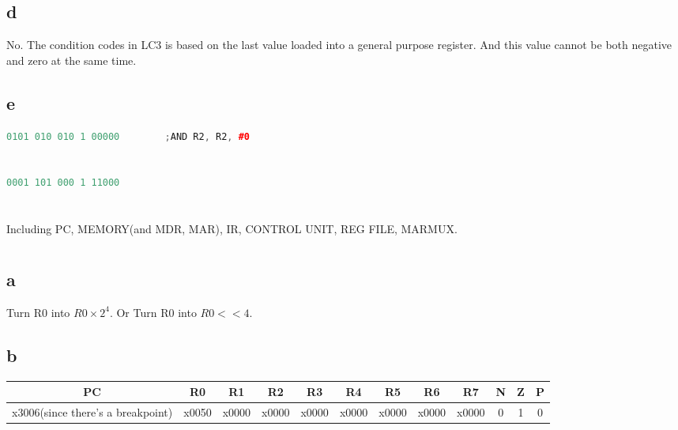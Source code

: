 \documentclass[11pt,a4paper]{article}
\begin{document}
	\subsection*{d}
	No. The condition codes in LC3 is based on the last value loaded into a general purpose register. And this value cannot be both negative and zero at the same time.\par
	\subsection*{e}
	\begin{lstlisting}[language=C++]
	0101 010 010 1 00000		;AND R2, R2, #0
	\end{lstlisting}
	
	\section{}
	\begin{lstlisting}[language=C++]
	0001 101 000 1 11000
	\end{lstlisting}
	
	\section{}
	Including PC, MEMORY(and MDR, MAR), IR, CONTROL UNIT, REG FILE, MARMUX.\par

	\section{}
	\subsection*{a}
	Turn R0 into $R0\times 2^{4}$. Or Turn R0 into $R0<<4$.
	\subsection*{b}
	\begin{table}[H]
		\footnotesize
		\begin{tabular}{|c|c|c|c|c|c|c|c|c|c|c|c|}
			\hline 
			PC & R0 & R1 & R2 & R3 & R4 & R5 & R6 & R7 & N & Z & P \\ 
			\hline 
			x3006(since there's a breakpoint) & x0050 & x0000 & x0000 & x0000 & x0000 & x0000 & x0000 & x0000 & 0 & 1 & 0 \\ 
			\hline 
		\end{tabular} 
	\end{table}
\end{document}
